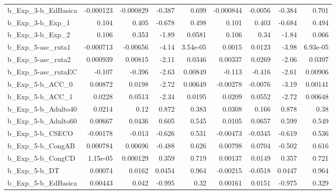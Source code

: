 \begin{tabular}{lrrrrrrrr}
b\_Exp\_3-b\_EdBasica         &   -0.000123 &    -0.000829 &    -0.387 &    0.699 &  -0.000844 &     -0.0056 &       -0.384 &         0.701 \\
b\_Exp\_3-b\_Exp\_1            &       0.104 &        0.405 &    -0.678 &    0.498 &      0.101 &       0.403 &       -0.684 &         0.494 \\
b\_Exp\_3-b\_Exp\_2            &       0.106 &        0.353 &     -1.89 &   0.0581 &      0.106 &        0.34 &        -1.84 &         0.066 \\
b\_Exp\_5-asc\_ruta1          &   -0.000713 &     -0.00656 &     -4.14 & 3.54e-05 &     0.0015 &      0.0123 &        -3.98 &      6.93e-05 \\
b\_Exp\_5-asc\_ruta2          &    0.000939 &      0.00815 &     -2.11 &   0.0346 &    0.00337 &      0.0269 &        -2.06 &        0.0397 \\
b\_Exp\_5-asc\_rutaEC         &      -0.107 &       -0.396 &     -2.63 &  0.00849 &     -0.113 &      -0.416 &        -2.61 &       0.00906 \\
b\_Exp\_5-b\_ACC\_0            &     0.00872 &       0.0198 &     -2.72 &  0.00649 &   -0.00278 &     -0.0076 &        -3.19 &       0.00141 \\
b\_Exp\_5-b\_ACC\_1            &      0.0228 &       0.0513 &     -2.34 &   0.0195 &     0.0209 &      0.0552 &        -2.72 &       0.00648 \\
b\_Exp\_5-b\_Adulto40         &      0.0214 &         0.12 &     0.872 &    0.383 &     0.0308 &       0.166 &        0.878 &          0.38 \\
b\_Exp\_5-b\_Adulto60         &     0.00667 &       0.0436 &     0.605 &    0.545 &     0.0105 &      0.0657 &        0.599 &         0.549 \\
b\_Exp\_5-b\_CSECO            &    -0.00178 &       -0.013 &    -0.626 &    0.531 &   -0.00473 &     -0.0345 &       -0.619 &         0.536 \\
b\_Exp\_5-b\_CongAB           &    0.000784 &      0.00696 &    -0.488 &    0.626 &    0.00798 &      0.0704 &       -0.502 &         0.616 \\
b\_Exp\_5-b\_CongCD           &    1.15e-05 &     0.000129 &     0.359 &    0.719 &    0.00137 &      0.0149 &        0.357 &         0.721 \\
b\_Exp\_5-b\_DT               &     0.00074 &       0.0162 &    0.0454 &    0.964 &   -0.00215 &     -0.0518 &       0.0447 &         0.964 \\
b\_Exp\_5-b\_EdBasica         &     0.00443 &        0.042 &    -0.995 &     0.32 &    0.00161 &      0.0151 &       -0.975 &         0.329 \\

\end{tabular}
